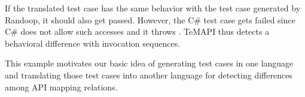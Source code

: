 If the translated test case has the same behavior with the test case generated by Randoop, it should also get passed. However, the C\# test case gets failed since C\# does not allow such accesses and it throws . TeMAPI thus detects a behavioral difference with invocation sequences.

This example motivates our basic idea of generating test cases in one language and translating those test cases into another language for detecting differences among API mapping relations. %


